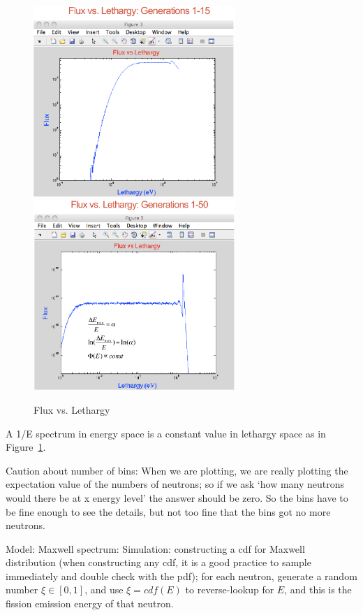 \documentclass{school-22.211-notes}
\begin{document}
\begin{figure}
  \centering
  \includegraphics[width=3in]{images/sl-d/flux-vs-lethargy-1.png}
  \includegraphics[width=3in]{images/sl-d/flux-vs-lethargy-2.png}
  \caption{Flux vs. Lethargy} \label{fvl}
\end{figure}
A 1/E spectrum in energy space is a constant value in lethargy space as in Figure~\ref{fvl}. 

Caution about number of bins: When we are plotting, we are really plotting the expectation value of the numbers of neutrons; so if we ask `how many neutrons would there be at x energy level' the answer should be zero. So the bins have to be fine enough to see the details, but not too fine that the bins got no more neutrons. 

\clearpage
{}
Model: Maxwell spectrum:
Simulation: constructing a cdf for Maxwell distribution (when constructing any cdf, it is a good practice to sample immediately and double check with the pdf); for each neutron, generate a random number $\xi \in [0,1]$, and use $\xi = cdf(E)$ to reverse-lookup for $E$, and this is the fission emission energy of that neutron. 
\end{document}
